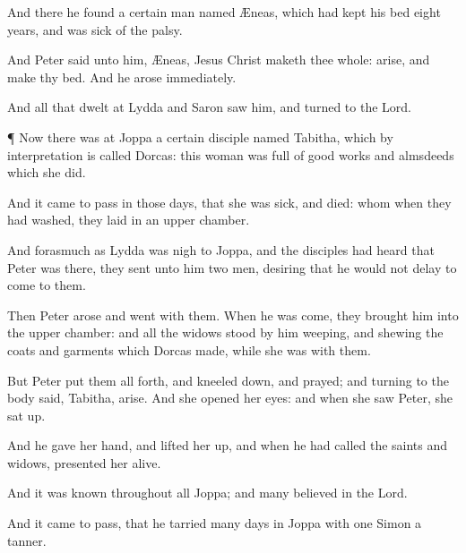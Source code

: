{And
there he
found a
certain
man
named
Æneas,
which had kept
his
bed
eight
years, and
was sick of the
palsy.

And
Peter
said unto
him,
Æneas,
Jesus
Christ
maketh
thee
whole:
arise,
and
make
thy
bed.
And he
arose
immediately.

And
all
that
dwelt at
Lydda
and
Saron
saw
him, and
turned
to the
Lord.


\par }{\PP {}¶
Now there
was
at
Joppa a
certain
disciple
named
Tabitha,
which by
interpretation is
called
Dorcas:
this
woman
was
full of
good
works
and
almsdeeds
which she
did.

And it came to
pass
in
those
days, that
she was
sick, and
died:
whom when they had
washed, they
laid
{}
in an upper
chamber.

And forasmuch
as
Lydda was
nigh to
Joppa,
and the
disciples had
heard
that
Peter
was
there, they
sent
unto
him
two
men,
desiring
{}
that he
would
not
delay to
come
to
them.

Then
Peter
arose and
went with
them.
When he was
come, they brought
him
into the upper
chamber:
and
all the
widows stood
by
him
weeping,
and
shewing the
coats
and
garments
which
Dorcas
made, while she
was
with
them.

But
Peter put
them
all
forth, and kneeled
down, and
prayed;
and
turning
{}
to the
body
said,
Tabitha,
arise.
And she
opened
her
eyes:
and when she
saw
Peter, she sat
up.

And he
gave
her
{}
hand, and
lifted
her
up,
and when he had
called the
saints
and
widows,
presented
her
alive.

And it
was
known
throughout
all
Joppa;
and
many
believed
in the
Lord.

And it came to
pass, that
he
tarried
many
days
in
Joppa
with
one
Simon a
tanner.




\par }

